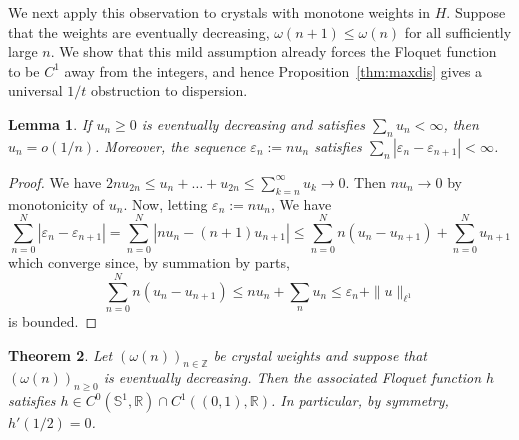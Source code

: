 \documentclass[11pt]{amsart}
\theoremstyle{plain}
\newtheorem{theorem}{Theorem}[section]
\newtheorem{lemma}[theorem]{Lemma}
\theoremstyle{definition}
\numberwithin{equation}{section}
\begin{document}
We next apply this observation to crystals with monotone weights in $H$. Suppose that the weights are eventually decreasing, $\omega(n+1)\leq \omega(n)$ for all sufficiently large $n$. We show that this mild assumption already forces the Floquet function to be $C^1$ away from the integers, and hence Proposition~\ref{thm:maxdis} gives a universal $1/t$ obstruction to dispersion.

\begin{lemma}
If $u_n \geq 0$ is eventually decreasing and satisfies $\sum_n u_n < \infty$, then $u_n = o(1/n)$. Moreover, the sequence $\varepsilon_n := n u_n$ satisfies $\sum_{n} |\varepsilon_n-\varepsilon_{n+1}|<\infty$.
\end{lemma}

\begin{proof}
We have $2n u_{2n} \leq u_n+\dots+u_{2n} \leq \sum_{k=n}^{\infty} u_k \rightarrow 0$. Then $n u_n \rightarrow 0$ by monotonicity of $u_n$. Now, letting $\varepsilon_n := n u_n$, We have $$ \sum_{n=0}^N |\varepsilon_n - \varepsilon_{n+1}| = \sum_{n=0}^N |n u_n - (n+1) u_{n+1}| \leq \sum_{n=0}^N n ( u_n -  u_{n+1}) + \sum_{n=0}^N u_{n+1} $$
which converge since, by summation by parts, $$ \sum_{n=0}^N n ( u_n -  u_{n+1}) \leq n u_n + \sum_{n} {u_n} \leq \varepsilon_n + \|u\|_{\ell^1}  $$
is bounded.
\end{proof}

\begin{theorem}\label{thm:monotone-regularity}
Let $(\omega(n))_{n\in\mathbb Z}$ be crystal weights and suppose that $(\omega(n))_{n\geq0}$ is eventually decreasing. Then the associated Floquet function $h$ satisfies $h\in C^0(\mathbb S^1,\mathbb R)\cap C^1((0,1),\mathbb R)$. In particular, by symmetry, $h'(1/2)=0$.
\end{theorem}
\end{document}
